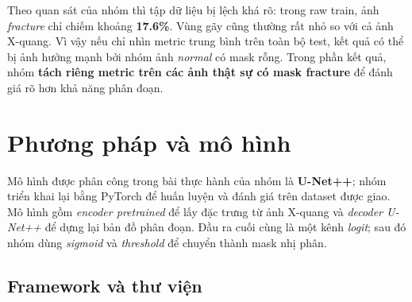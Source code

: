 \documentclass[12pt,a4paper]{article}
\newcommand{\thead}[1]{\cellcolor{tablehead}\textbf{#1}}
\DeclareRobustCommand{\code}[1]{%
  \begingroup
  \setlength{\fboxsep}{1.4pt}%
  \colorbox{softgray}{\texttt{\footnotesize\color{headingblue}\strut #1}}%
  \endgroup
}
\newcommand{\important}[1]{\textbf{#1}}
\begin{document}
Theo quan sát của nhóm thì tập dữ liệu bị lệch khá rõ: trong raw train, ảnh \textit{fracture} chỉ chiếm khoảng \important{17.6\%}. Vùng gãy cũng thường rất nhỏ so với cả ảnh X-quang. Vì vậy nếu chỉ nhìn metric trung bình trên toàn bộ test, kết quả có thể bị ảnh hưởng mạnh bởi nhóm ảnh \textit{normal} có mask rỗng. Trong phần kết quả, nhóm \important{tách riêng metric trên các ảnh thật sự có mask fracture} để đánh giá rõ hơn khả năng phân đoạn.

\section{Phương pháp và mô hình}
Mô hình được phân công trong bài thực hành của nhóm là \important{U-Net++}; nhóm triển khai lại bằng PyTorch để huấn luyện và đánh giá trên dataset được giao. Mô hình gồm \textit{encoder pretrained} để lấy đặc trưng từ ảnh X-quang và \textit{decoder U-Net++} để dựng lại bản đồ phân đoạn. Đầu ra cuối cùng là một kênh \textit{logit}; sau đó nhóm dùng \textit{sigmoid} và \textit{threshold} để chuyển thành mask nhị phân.

\subsection*{Framework và thư viện}
\begin{table}[H]
\centering
\footnotesize
{}
\end{table}
\end{document}
